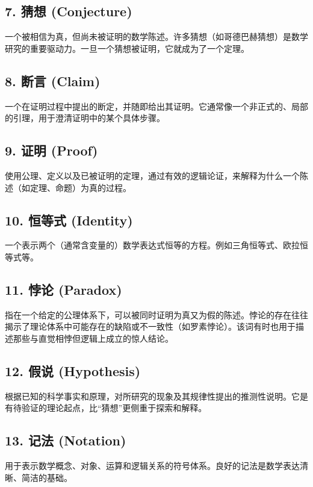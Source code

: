 \subsection*{7. 猜想 (Conjecture)}
一个被相信为真，但尚未被证明的数学陈述。许多猜想（如哥德巴赫猜想）是数学研究的重要驱动力。一旦一个猜想被证明，它就成为了一个定理。

\subsection*{8. 断言 (Claim)}
一个在证明过程中提出的断定，并随即给出其证明。它通常像一个非正式的、局部的引理，用于澄清证明中的某个具体步骤。

\subsection*{9. 证明 (Proof)}
使用公理、定义以及已被证明的定理，通过有效的逻辑论证，来解释为什么一个陈述（如定理、命题）为真的过程。

\subsection*{10. 恒等式 (Identity)}
一个表示两个（通常含变量的）数学表达式恒等的方程。例如三角恒等式、欧拉恒等式等。

\subsection*{11. 悖论 (Paradox)}
指在一个给定的公理体系下，可以被同时证明为真又为假的陈述。悖论的存在往往揭示了理论体系中可能存在的缺陷或不一致性（如罗素悖论）。该词有时也用于描述那些与直觉相悖但逻辑上成立的惊人结论。

\subsection*{12. 假说 (Hypothesis)}
根据已知的科学事实和原理，对所研究的现象及其规律性提出的推测性说明。它是有待验证的理论起点，比“猜想”更侧重于探索和解释。

\subsection*{13. 记法 (Notation)}
用于表示数学概念、对象、运算和逻辑关系的符号体系。良好的记法是数学表达清晰、简洁的基础。
